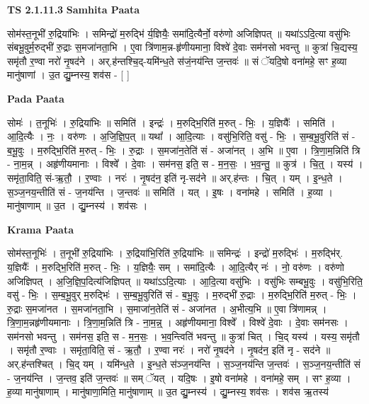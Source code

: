 \documentclass[17pt]{extarticle}
\begin{document}
\textbf{TS 2.1.11.3 } \newline
\textbf{Samhita Paata} \newline

सोम॑स्त॒नूभी॑ रु॒द्रिया॑भिः । समिन्द्रो॑ म॒रुद्भि॑ र्य॒ज्ञियैः॒ समा॑दि॒त्यैर्नो॒ वरु॑णो अजिज्ञिपत् ॥ यथा॑ऽऽदि॒त्या वसु॑भिः संबभू॒वुर्म॒रुद्भी॑ रु॒द्राः स॒मजा॑नता॒भि । ए॒वा त्रि॑णाम॒न्न-हृ॑णीयमाना॒ विश्वे॑ दे॒वाः सम॑नसो भवन्तु ॥ कुत्रा॑ चि॒द्यस्य॒ समृ॑तौ र॒ण्वा नरो॑ नृ॒षद॑ने । अर्.ह॑न्तश्चि॒द्-यमि॑न्ध॒ते स॑जं॒नय॑न्ति ज॒न्तवः॑ ॥ सं ॅयदि॒षो वना॑महे॒ सꣳ ह॒व्या मानु॑षाणां । उ॒त द्यु॒म्नस्य॒ शव॑स - [  ] \newline

\textbf{Pada Paata} \newline

सोमः॑ । त॒नूभिः॑ । रु॒द्रिया॑भिः ॥ समिति॑ । इन्द्रः॑ । म॒रुद्भि॒रिति॑ म॒रुत् - भिः॒ । य॒ज्ञियैः᳚ । समिति॑ । आ॒दि॒त्यैः । नः॒ । वरु॑णः । अ॒जि॒ज्ञि॒प॒त् ॥ यथा᳚ । आ॒दि॒त्याः । वसु॑भि॒रिति॒ वसु॑ - भिः॒ । स॒म्ब॒भू॒वुरिति॑ सं - ब॒भू॒वुः । म॒रुद्भि॒रिति॑ म॒रुत् - भिः॒ । रु॒द्राः । स॒मजा॑न॒तेति॑ सं - अजा॑नत् । अ॒भि ॥ ए॒वा । त्रि॒णा॒म॒न्निति॑ त्रि - ना॒म॒न्न् । अहृ॑णीयमानाः । विश्वे᳚ । दे॒वाः । सम॑नस॒ इति॒ स - म॒न॒सः॒ । भ॒व॒न्तु॒ ॥ कुत्र॑ । चि॒त्॒ । यस्य॑ । समृ॑ता॒विति॒ सं-ऋ॒तौ॒ । र॒ण्वाः । नरः॑ । नृ॒षद॑न॒ इति॑ नृ-सद॑ने ॥ अर्.ह॑न्तः । चि॒त् । यम् । इ॒न्ध॒ते । स॒ञ्ज॒नय॒न्तीति॑ सं - ज॒नय॑न्ति । ज॒न्तवः॑ ॥ समिति॑ । यत् । इ॒षः । वना॑महे । समिति॑ । ह॒व्या । मानु॑षाणाम् ॥ उ॒त । द्यु॒म्नस्य॑ । शव॑सः ।  \newline


\textbf{Krama Paata} \newline

सोम॑स्त॒नूभिः॑ । त॒नूभी॑ रु॒द्रिया॑भिः । रु॒द्रिया॑भि॒रिति॑ रु॒द्रिया॑भिः ॥ समिन्द्रः॑ । इन्द्रो॑ म॒रुद्भिः॑ । म॒रुद्भि॑र्. य॒ज्ञियैः᳚ । म॒रुद्भि॒रिति॑ म॒रुत् - भिः॒ । य॒ज्ञियैः॒ सम् । समा॑दि॒त्यैः । आ॒दि॒त्यैर् नः॑ । नो॒ वरु॑णः । वरु॑णो अजिज्ञिपत् । अ॒जि॒ज्ञि॒प॒दित्य॑जिज्ञिपत् ॥ यथा॑ऽऽदि॒त्याः । आ॒दि॒त्या वसु॑भिः । वसु॑भिः सम्बभू॒वुः । वसु॑भि॒रिति॒ वसु॑ - भिः॒ । स॒म्ब॒भू॒वुर् म॒रुद्भिः॑ । स॒म्ब॒भू॒वुरिति॑ सं - ब॒भू॒वुः । म॒रुद्भी॑ रु॒द्राः । म॒रुद्भि॒रिति॑ म॒रुत् - भिः॒ । रु॒द्राः स॒मजा॑नत । स॒मजा॑नता॒भि । स॒माजा॑न॒तेति॑ सं - अजा॑नत । अ॒भीत्य॒भि ॥ ए॒वा त्रि॑णामन्न् । त्रि॒णा॒म॒न्नहृ॑णीयमानाः । त्रि॒णा॒म॒न्निति॑ त्रि - ना॒म॒न्न्॒ । अहृ॑णीयमाना॒ विश्वे᳚ । विश्वे॑ दे॒वाः । दे॒वाः सम॑नसः । सम॑नसो भवन्तु । सम॑नस॒ इति॒ स - म॒न॒सः॒ । भ॒व॒न्त्विति॑ भवन्तु ॥ कुत्रा॑ चित् । चि॒द् यस्य॑ । यस्य॒ समृ॑तौ । समृ॑तौ र॒ण्वाः । समृ॑ता॒विति॒ सं - ऋ॒तौ॒ । र॒ण्वा नरः॑ । नरो॑ नृ॒षद॑ने । नृ॒षद॑न॒ इति॑ नृ - सद॑ने ॥ अर्.ह॑न्तश्चित् । चि॒द् यम् । यमि॑न्ध॒ते । इ॒न्ध॒ते स॑ञ्ज॒नय॑न्ति । स॒ञ्ज॒नय॑न्ति ज॒न्तवः॑ । स॒ञ्ज॒नय॒न्तीति॑ सं - ज॒नय॑न्ति । ज॒न्तव॒ इति॑ ज॒न्तवः॑ ॥ सम् ॅयत् । यदि॒षः । इ॒षो वना॑महे । वना॑महे॒ सम् । सꣳ ह॒व्या । ह॒व्या मानु॑षाणाम् । मानु॑षाणा॒मिति॒ मानु॑षाणाम् ॥ उ॒त द्यु॒म्नस्य॑ । द्यु॒म्नस्य॒ शव॑सः । शव॑स ऋ॒तस्य॑ \newline
\end{document}
